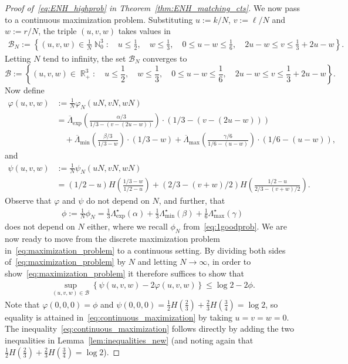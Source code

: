 \documentclass[11pt]{article}
\numberwithin{equation}{section}
\DeclareMathOperator{\R}{\mathbb{R}} %
\DeclareMathOperator{\N}{\mathbb{N}} %
\def\cB{{\mathcal B}}
\theoremstyle{definition}
\begin{document}
\begin{proof}[Proof of~\eqref{eq:ENH_highprob} in Theorem~\ref{thm:ENH_matching_cts}]
We now pass to a continuous maximization problem. Substituting $u := k/N$, $v:= \ell/N$ and $w:=r/N$, the triple $(u,v,w)$ takes values in 
\begin{align*}
    \cB_N := \left\{(u,v,w) \in \frac{1}{N}\N_0^3: \quad u\leq \frac{1}{2}, \quad w\leq \frac{1}{3},\quad  0 \leq u-w \leq \frac{1}{6}, \quad 2u-w \leq v \leq \frac{1}{3} +2u - w\right\}.
\end{align*}
Letting $N$ tend to infinity, the set $\cB_{N}$ converges to 
\begin{equation}\label{eq:B}
    \cB := \left\{(u,v,w) \in \R_{+}^{3}: \quad u\leq \frac{1}{2}, \quad w\leq \frac{1}{3},\quad  0\leq u-w \leq \frac{1}{6}, \quad 2u - w \leq v \leq \frac{1}{3} +2u - w\right\}.
\end{equation}
Now define 
\begin{align}
    \varphi(u,v,w) & := \frac{1}{N}\varphi_N(uN, vN, wN) \label{eq:scaled_varphi} \\
    & = \overline{\Lambda}_{\exp} \left(\frac{\alpha /3 }{1/3 - (v - (2u - w))} \right) \cdot \left( 1/3 - (v - (2u - w)) \right)\\
     & \quad + \overline{\Lambda}_{\min} \left(  \frac{\beta/3}{1/3 - w} \right) \cdot \left( 1/3 - w \right)
     + \overline{\Lambda}_{\max} \left(\frac{\gamma /6}{1/6 - (u-w)} \right) \cdot \left( 1/6 - (u-w) \right),
\end{align}
and 
\begin{align}
    \psi(u,v,w) & := \frac{1}{N} \psi_N(uN,vN,wN) \label{eq:scaled_psi} \\
    & = (1/2 - u)H\left(\frac{1/3 - w}{1/2 - u}\right) + (2/3 - (v+w)/2)H\left(\frac{1/2 - u}{2/3 - (v+w)/2}\right).
\end{align}
Observe that $\varphi$ and $\psi$ do not depend on $N$, and further, that 
\begin{align*}
    \phi := \frac{1}{N}\phi_N = \frac{1}{3} \Lambda_{\exp}^{\star} (\alpha) + \frac{1}{3} \Lambda_{\min}^{\star} (\beta)+\frac{1}{6} \Lambda_{\max}^{\star} (\gamma)
\end{align*}
does not depend on $N$ either, where we recall $\phi_N$ from~\eqref{eq:1goodprob}. We are now ready to move from the discrete maximization problem in~\eqref{eq:maximization_problem} to a continuous setting. By dividing both sides of~\eqref{eq:maximization_problem} by $N$ and letting $N\to \infty$, in order to show~\eqref{eq:maximization_problem} it therefore suffices to show that 
\begin{align}\label{eq:continuous_maximization}
    \sup_{(u,v,w) \in \cB} \left\{ \psi(u,v,w) - 2 \varphi(u,v,w) \right\} \leq \log 2 - 2\phi . 
\end{align}
Note that 
$\varphi(0,0,0) = \phi$ 
and 
$\psi(0,0,0) = \frac{1}{2}H(\frac{2}{3}) + \frac{2}{3}H(\frac{3}{4}) = \log 2$, 
so equality is attained in~\eqref{eq:continuous_maximization} by taking $u=v=w=0$. 
The inequality~\eqref{eq:continuous_maximization} follows directly 
by adding the two inequalities in Lemma~\ref{lem:inequalities_new} (and noting again that $\frac{1}{2}H(\frac{2}{3}) + \frac{2}{3}H(\frac{3}{4}) = \log 2$).
\end{proof}
\end{document}
